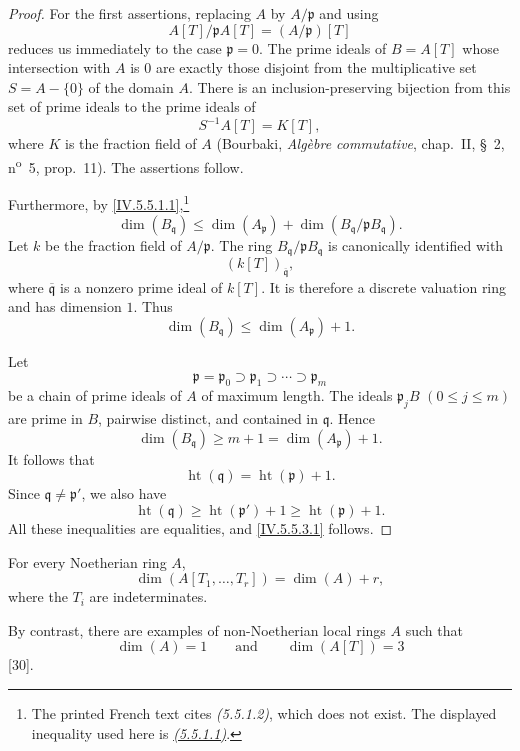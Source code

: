 \begin{proof}
For the first assertions, replacing $A$ by $A/\mathfrak p$ and using
\[
A[T]/\mathfrak pA[T]=(A/\mathfrak p)[T]
\]
reduces us immediately to the case $\mathfrak p=0$.
The prime ideals of $B=A[T]$ whose intersection with $A$ is $0$ are
exactly those disjoint from the multiplicative set
$S=A-\{0\}$ of the domain $A$.
There is an inclusion-preserving bijection from this set of prime
ideals to the prime ideals of
\[
S^{-1}A[T]=K[T],
\]
where $K$ is the fraction field of $A$
(Bourbaki, \emph{Alg\`ebre commutative}, chap.~II, \S~2,
n\textsuperscript{o}~5, prop.~11).
The assertions follow.

Furthermore, by \eqref{IV.5.5.1.1},\footnote{The printed French text
cites \emph{(5.5.1.2)}, which does not exist.  The displayed
inequality used here is \emph{{\hyperref[IV.5.5.1.1]{(5.5.1.1)}}}.}
\[
\dim(B_{\mathfrak q})
 \leq\dim(A_{\mathfrak p})
   +\dim(B_{\mathfrak q}/\mathfrak pB_{\mathfrak q}).
\]
Let $k$ be the fraction field of $A/\mathfrak p$.
The ring $B_{\mathfrak q}/\mathfrak pB_{\mathfrak q}$ is canonically
identified with
\[
(k[T])_{\overline{\mathfrak q}},
\]
where $\overline{\mathfrak q}$ is a nonzero prime ideal of $k[T]$.
It is therefore a discrete valuation ring and has dimension $1$.
Thus
\[
\dim(B_{\mathfrak q})\leq\dim(A_{\mathfrak p})+1.
\]

Let
\[
\mathfrak p=\mathfrak p_0
 \supset\mathfrak p_1
 \supset\cdots
 \supset\mathfrak p_m
\]
be a chain of prime ideals of $A$ of maximum length.
The ideals $\mathfrak p_jB$ $(0\leq j\leq m)$ are prime in $B$,
pairwise distinct, and contained in $\mathfrak q$.
Hence
\[
\dim(B_{\mathfrak q})
 \geq m+1
 =\dim(A_{\mathfrak p})+1.
\]
It follows that
\[
\operatorname{ht}(\mathfrak q)
  =\operatorname{ht}(\mathfrak p)+1.
\]
Since $\mathfrak q\neq\mathfrak p'$, we also have
\[
\operatorname{ht}(\mathfrak q)
 \geq\operatorname{ht}(\mathfrak p')+1
 \geq\operatorname{ht}(\mathfrak p)+1.
\]
All these inequalities are equalities, and
\eqref{IV.5.5.3.1} follows.
\end{proof}

\begin{corollary}[5.5.4]
\label{IV.5.5.4}
For every Noetherian ring $A$,
\begin{equation}
\dim(A[T_1,\ldots,T_r])=\dim(A)+r,
\tag{5.5.4.1}\label{IV.5.5.4.1}
\end{equation}
where the $T_i$ are indeterminates.
\end{corollary}

By contrast, there are examples of non-Noetherian local rings $A$
such that
\[
\dim(A)=1
\qquad\text{and}\qquad
\dim(A[T])=3
\]
[30].

